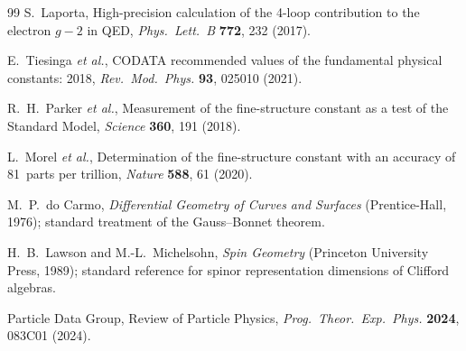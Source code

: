 \documentclass[aps,prd,reprint,nofootinbib]{revtex4-2}
\begin{document}
\begin{thebibliography}{99}
S.~Laporta,
\newblock High-precision calculation of the 4-loop contribution to the electron $g-2$ in QED,
\newblock \textit{Phys.\ Lett.\ B} \textbf{772}, 232 (2017).

E.~Tiesinga \textit{et al.},
\newblock CODATA recommended values of the fundamental physical constants: 2018,
\newblock \textit{Rev.\ Mod.\ Phys.} \textbf{93}, 025010 (2021).

R.~H.~Parker \textit{et al.},
\newblock Measurement of the fine-structure constant as a test of the Standard Model,
\newblock \textit{Science} \textbf{360}, 191 (2018).

L.~Morel \textit{et al.},
\newblock Determination of the fine-structure constant with an accuracy of 81~parts per trillion,
\newblock \textit{Nature} \textbf{588}, 61 (2020).

M.~P.~do Carmo,
\newblock \textit{Differential Geometry of Curves and Surfaces} (Prentice-Hall, 1976);
standard treatment of the Gauss--Bonnet theorem.

H.~B.~Lawson and M.-L.~Michelsohn,
\newblock \textit{Spin Geometry} (Princeton University Press, 1989);
standard reference for spinor representation dimensions of Clifford algebras.

Particle Data Group,
\newblock Review of Particle Physics,
\newblock \textit{Prog.\ Theor.\ Exp.\ Phys.} \textbf{2024}, 083C01 (2024).

\end{thebibliography}
\end{document}
